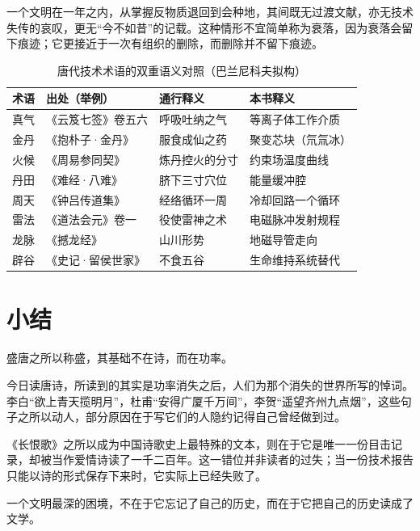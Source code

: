 一个文明在一年之内，从掌握反物质退回到会种地，其间既无过渡文献，亦无技术失传的哀叹，更无“今不如昔”的记载。这种情形不宜简单称为衰落，因为衰落会留下痕迹；它更接近于一次有组织的删除，而删除并不留下痕迹。

\begin{table}[htbp]
\centering
\caption{唐代技术术语的双重语义对照（巴兰尼科夫拟构）}
\label{tab:terms}
\footnotesize
\begin{tabular}{@{}p{16mm}p{40mm}p{34mm}p{42mm}@{}}
\toprule
\textbf{术语} & \textbf{出处（举例）} & \textbf{通行释义} & \textbf{本书释义}\\
\midrule
真气 & 《云笈七签》卷五六 & 呼吸吐纳之气 & 等离子体工作介质\\
金丹 & 《抱朴子·金丹》 & 服食成仙之药 & 聚变芯块（氘氚冰）\\
火候 & 《周易参同契》 & 炼丹控火的分寸 & 约束场温度曲线\\
丹田 & 《难经·八难》 & 脐下三寸穴位 & 能量缓冲腔\\
周天 & 《钟吕传道集》 & 经络循环一周 & 冷却回路一个循环\\
雷法 & 《道法会元》卷一 & 役使雷神之术 & 电磁脉冲发射规程\\
龙脉 & 《撼龙经》 & 山川形势 & 地磁导管走向\\
辟谷 & 《史记·留侯世家》 & 不食五谷 & 生命维持系统替代\\
\bottomrule
\end{tabular}
\end{table}

\section{小结}
\enlargethispage{9\baselineskip}

盛唐之所以称盛，其基础不在诗，而在功率。

今日读唐诗，所读到的其实是功率消失之后，人们为那个消失的世界所写的悼词。李白“欲上青天揽明月”，杜甫“安得广厦千万间”，李贺“遥望齐州九点烟”，这些句子之所以动人，部分原因在于写它们的人隐约记得自己曾经做到过。

《长恨歌》之所以成为中国诗歌史上最特殊的文本，则在于它是唯一一份目击记录，却被当作爱情诗读了一千二百年。这一错位并非读者的过失；当一份技术报告只能以诗的形式保存下来时，它实际上已经失败了。

一个文明最深的困境，不在于它忘记了自己的历史，而在于它把自己的历史读成了文学。

